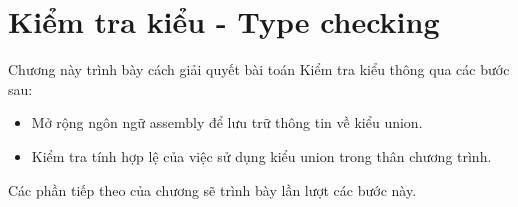 \chapter{Kiểm tra kiểu - Type checking}
\label{chap:typechecking}
Chương này trình bày cách giải quyết bài toán Kiểm tra kiểu thông qua các bước sau:
\begin{itemize}
\item Mở rộng ngôn ngữ assembly để lưu trữ thông tin về kiểu union.
\item Kiểm tra tính hợp lệ của việc sử dụng kiểu union trong thân chương trình.
\end{itemize}

Các phần tiếp theo của chương sẽ trình bày lần lượt các bước này.

